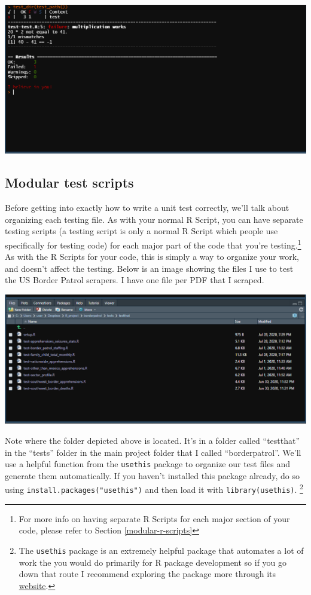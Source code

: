 \documentclass[
  12pt,
  openany]{book}
\begin{document}
\includegraphics{images/test_summary.PNG}

\hypertarget{modular-test-scripts}{%
\subsection{Modular test scripts}\label{modular-test-scripts}}

Before getting into exactly how to write a unit test correctly, we'll talk about organizing each testing file. As with your normal R Script, you can have separate testing scripts (a testing script is only a normal R Script which people use specifically for testing code) for each major part of the code that you're testing.\footnote{For more info on having separate R Scripts for each major section of your code, please refer to Section \ref{modular-r-scripts}} As with the R Scripts for your code, this is simply a way to organize your work, and doesn't affect the testing. Below is an image showing the files I use to test the US Border Patrol scrapers. I have one file per PDF that I scraped.

\includegraphics{images/test_file_setup.PNG}

Note where the folder depicted above is located. It's in a folder called ``testthat'' in the ``tests'' folder in the main project folder that I called ``borderpatrol''. We'll use a helpful function from the \texttt{usethis} package to organize our test files and generate them automatically. If you haven't installed this package already, do so using \texttt{install.packages("usethis")} and then load it with \texttt{library(usethis)}. \footnote{The \texttt{usethis} package is an extremely helpful package that automates a lot of work the you would do primarily for R package development so if you go down that route I recommend exploring the package more through its \href{https://usethis.r-lib.org/index.html}{website}.}
\end{document}
